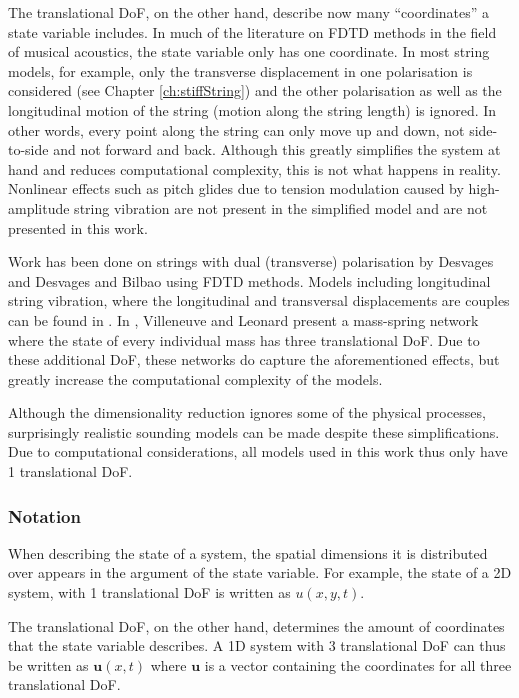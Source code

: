 The translational DoF, on the other hand, describe now many ``coordinates'' a state variable includes. 
In much of the literature on FDTD methods in the field of musical acoustics, the state variable only has one coordinate. In most string models, for example, only the transverse displacement in one polarisation is considered (see Chapter \ref{ch:stiffString}) and the other polarisation as well as the longitudinal motion of the string (motion along the string length) is ignored. In other words, every point along the string can only move up and down, not side-to-side and not forward and back. Although this greatly simplifies the system at hand and reduces computational complexity, this is not what happens in reality. Nonlinear effects such as pitch glides due to tension modulation caused by high-amplitude string vibration are not present in the simplified model and are not presented in this work. 

Work has been done on strings with dual (transverse) polarisation by Desvages \cite{Desvages2018} and Desvages and Bilbao \cite{Desvages2016} using FDTD methods. Models including longitudinal string vibration, where the longitudinal and transversal displacements are couples can be found in \cite{theBible,Bilbao2009spring}.
In \cite{Villeneuve2019}, Villeneuve and Leonard present a mass-spring network where the state of every individual mass has three translational DoF. Due to these additional DoF, these networks do capture the aforementioned effects, but greatly increase the computational complexity of the models.

Although the dimensionality reduction ignores some of the physical processes, surprisingly realistic sounding models can be made despite these simplifications. Due to computational considerations, all models used in this work thus only have 1 translational DoF.

\subsubsection{Notation}
When describing the state of a system, the spatial dimensions it is distributed over appears in the argument of the state variable. For example, the state of a 2D system, with 1 translational DoF is written as $u(x,y,t)$.

The translational DoF, on the other hand, determines the amount of coordinates that the state variable describes. A 1D system with 3 translational DoF can thus be written as $\mathbf{u}(x,t)$ where $\mathbf{u}$ is a vector containing the coordinates for all three translational DoF.  

